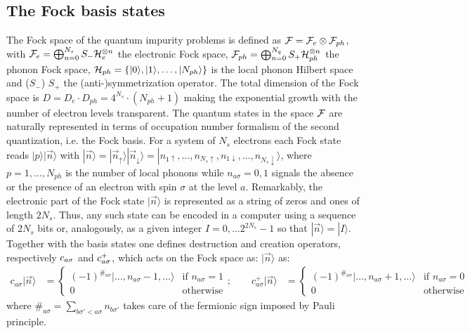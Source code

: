 \documentclass[final,3p,10pt]{elsarticle}
\newcommand{\ket}[1]
{|#1\rangle}
\def\up{\uparrow} \def\down{\downarrow} \def\dw{\downarrow}
\begin{document}
\subsection{The Fock basis states}\label{sSecBasis}
The Fock space of the quantum impurity problems is defined as
${\cal F}={\cal F}_e\otimes {\cal F}_{ph}$, with ${\cal F}_e=\bigoplus_{n=0}^{N_s}
S_-{\cal H}_e^{\otimes n}$ the electronic Fock space,  ${\cal F}_{ph}=\bigoplus_{n=0}^{N_q}S_+{\cal H}_{ph}^{\otimes n}$ the
phonon Fock space,  $\HH_{ph}=\{\ket{0},\ket{1},\dots,\ket{N_{ph}}\}$ is the local phonon Hilbert space
and ($S_-$)  $S_+$ the (anti-)symmetrization operator.  
The total dimension of the Fock space is
$D=D_e\cdot D_{ph}=4^{N_s}\cdot (N_{ph}+1)$ making the exponential
growth with the number of electron levels transparent. 
The quantum states in the space ${\cal F}$ are naturally represented in
terms of occupation number formalism of the second quantization,
i.e. the Fock basis. For a system of $N_s$ electrons each Fock state
reads $\ket{p}\ket{\vec{n}}$ with $\ket{\vec{n}}=\ket{\vec{n}_\up}\ket{\vec{n}_\dw}=\ket{n_{1\up},\dots,n_{N_s\up},n_{1\dw},\dots,n_{N_s\dw}}$, 
where $p=1,\dots,N_{ph}$ is the number of local phonons while $n_{a\sigma}=0,1$ signals the absence or the
presence of an electron with spin $\sigma$ at the level $a$.
Remarkably, the electronic part of the Fock state $\ket{\vec{n}}$ is represented as a string of
zeros and ones of length $2N_s$. Thus, any such state can  be encoded
in a computer using a sequence of $2N_s$ bits or, analogously, as a
given integer $I=0,\dots 2^{2N_s}-1$ so that $\ket{\vec{n}}=\ket{I}$.  
Together with the basis states one defines  destruction and creation 
operators, respectively $c_{a\sigma}$ and $c^+_{a\sigma}$, which acts on the
Fock space as: 
$\ket{\vec{n}}$ as:  
\begin{align*}
  c_{a\sigma}\ket{\vec{n}} &=
    \begin{cases}
      (-1)^{\#_{a\sigma}}\ket{\dots,n_{a\sigma}\!-\!1,\dots}
      &\text{if $n_{a\sigma}\!=\! 1$}\\
      0 &\text{otherwise}
    \end{cases};\qquad
    c^{+}_{a\sigma}\ket{\vec{n}} &=
     \begin{cases}
      (-1)^{\#_{a\sigma}}\ket{\dots,n_{a\sigma}\!+\!1,\dots}
      & \text{if $n_{a\sigma}\!=\! 0$}\\
      0 & \text{otherwise}
    \end{cases}    
\end{align*}
where $\#_{a\sigma}=\sum_{b\sigma'<a\sigma} n_{b\sigma'}$ takes care
of the fermionic sign imposed by Pauli principle. 
\end{document}
